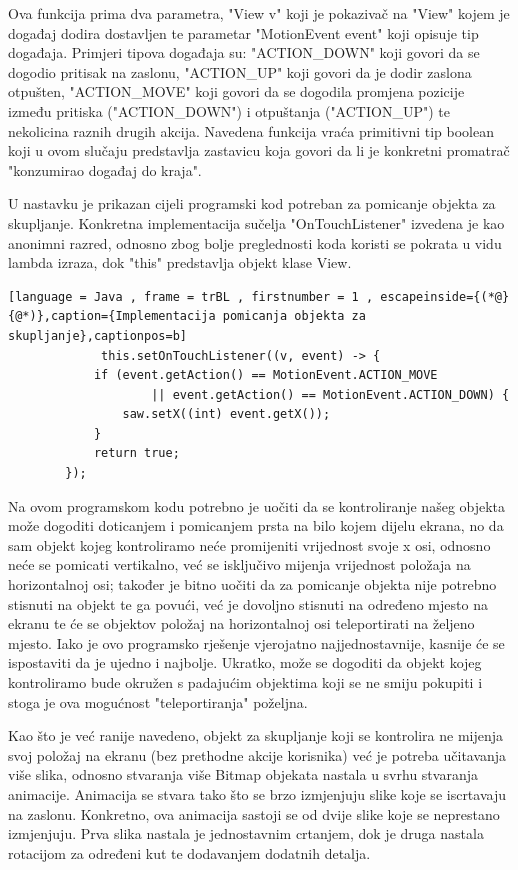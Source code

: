 \documentclass[times, utf8, zavrsni, numeric]{fer}
\begin{document}
	Ova funkcija prima dva parametra, "View v" koji je pokazivač na "View" kojem je događaj dodira dostavljen te parametar "MotionEvent event" koji opisuje tip događaja. Primjeri tipova događaja su: 
	"ACTION\_DOWN" koji govori da se dogodio pritisak na zaslonu, "ACTION\_UP" koji govori da je dodir zaslona otpušten, "ACTION\_MOVE" koji govori da se dogodila promjena pozicije između pritiska ("ACTION\_DOWN") i otpuštanja
	("ACTION\_UP") te nekolicina raznih drugih akcija. Navedena funkcija vraća primitivni tip boolean koji u ovom slučaju predstavlja zastavicu koja govori da li je konkretni promatrač "konzumirao događaj do kraja".
	
	U nastavku je prikazan cijeli programski kod potreban za pomicanje objekta za skupljanje. Konkretna implementacija sučelja "OnTouchListener" izvedena je kao anonimni razred, odnosno zbog bolje preglednosti koda 
	koristi se pokrata u vidu lambda izraza, dok "this" predstavlja objekt klase View.
		 \renewcommand{\lstlistingname}{Kôd}
		\begin{lstlisting}[language = Java , frame = trBL , firstnumber = 1 , escapeinside={(*@}{@*)},caption={Implementacija pomicanja objekta za skupljanje},captionpos=b]
			 this.setOnTouchListener((v, event) -> {
            if (event.getAction() == MotionEvent.ACTION_MOVE 
					|| event.getAction() == MotionEvent.ACTION_DOWN) {
                saw.setX((int) event.getX());
            }
            return true;
        });
		\end{lstlisting}


		
	Na ovom programskom kodu potrebno je uočiti da se kontroliranje našeg objekta može dogoditi doticanjem i pomicanjem prsta na bilo kojem dijelu ekrana, no da sam objekt kojeg kontroliramo neće promijeniti 
	vrijednost svoje x osi, odnosno neće se pomicati vertikalno, već se isključivo mijenja vrijednost položaja na horizontalnoj osi; također je bitno uočiti da za pomicanje objekta nije potrebno stisnuti na objekt
	te ga povući, već je dovoljno stisnuti na određeno mjesto na ekranu te će se objektov položaj na horizontalnoj  osi teleportirati na željeno mjesto. Iako je ovo programsko rješenje vjerojatno najjednostavnije, 
	kasnije će se ispostaviti da je ujedno i najbolje. Ukratko, može se dogoditi da objekt kojeg kontroliramo bude okružen s padajućim objektima koji se ne smiju pokupiti i stoga je ova mogućnost "teleportiranja" poželjna.
	
	
	Kao što je već ranije navedeno, objekt za skupljanje koji se kontrolira ne mijenja svoj položaj na ekranu (bez prethodne akcije korisnika) već je potreba učitavanja više slika, odnosno stvaranja više Bitmap 
	objekata nastala u svrhu stvaranja animacije. Animacija se stvara tako što se brzo izmjenjuju slike koje se iscrtavaju na zaslonu. Konkretno, ova animacija sastoji se od dvije slike koje se neprestano izmjenjuju.
	Prva slika nastala je jednostavnim crtanjem, dok je druga nastala rotacijom za određeni kut te dodavanjem dodatnih detalja. 
	
\end{document}

